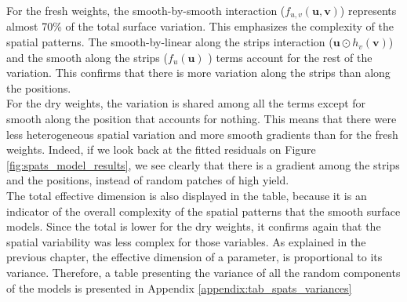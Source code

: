 For the fresh weights, the smooth-by-smooth interaction ($f_{u, v}(\boldsymbol{u}, \boldsymbol{v})$) represents almost 70\% of the total surface variation. This emphasizes the complexity of the spatial patterns. The smooth-by-linear along the strips interaction ($\boldsymbol{u} \odot h_{v}(\boldsymbol{v})$) and the smooth along the strips ($f_{u}(\mathbf{u})$ ) terms account for the rest of the variation. This confirms that there is more variation along the strips than along the positions.\\

For the dry weights, the variation is shared among all the terms except for smooth along the position that accounts for nothing. This means that there were less heterogeneous spatial variation and more smooth gradients than for the fresh weights. Indeed, if we look back at the fitted residuals on Figure \ref{fig:spats_model_results}, we see clearly that there is a gradient among the strips and the positions, instead of random patches of high yield.\\

The total effective dimension is also displayed in the table, because it is an indicator of the overall complexity of the spatial patterns that the smooth surface models. Since the total is lower for the dry weights, it confirms again that the spatial variability was less complex for those variables. As explained in the previous chapter, the effective dimension of a parameter, is proportional to its variance. Therefore, a table presenting the variance of all the random components of the models is presented in Appendix \ref{appendix:tab_spats_variances}

